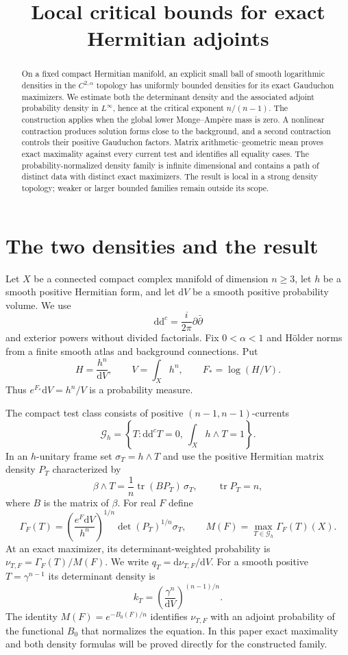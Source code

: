 \documentclass[11pt]{article}
\title{Local critical bounds for exact Hermitian adjoints}
\author{}
\date{}
\newcommand{\ddc}{\mathrm{d}\mathrm{d}^c}
\newcommand{\Ga}{\mathcal G_h}
\begin{document}
\maketitle
\begin{abstract}
On a fixed compact Hermitian manifold, an explicit small ball of smooth
logarithmic densities in the $C^{2,\alpha}$ topology has uniformly bounded
densities for its exact Gauduchon maximizers. We estimate both the determinant
density and the associated adjoint probability density in $L^\infty$, hence
at the critical exponent $n/(n-1)$. The construction applies when the global
lower Monge--Amp\`ere mass is zero. A nonlinear contraction produces solution
forms close to the background, and a second contraction controls their
positive Gauduchon factors. Matrix arithmetic--geometric mean proves exact
maximality against every current test and identifies all equality cases.
The probability-normalized density family is infinite dimensional and
contains a path of distinct data with distinct exact maximizers. The result
is local in a strong density topology; weaker or larger bounded families
remain outside its scope.
\end{abstract}

\section{The two densities and the result}

Let $X$ be a connected compact complex manifold of dimension $n\ge3$,
let $h$ be a smooth positive Hermitian form, and let $\mathrm dV$ be a
smooth positive probability volume. We use
\[
 \ddc=\frac{i}{2\pi}\partial\bar\partial
\]
and exterior powers without divided factorials. Fix $0<\alpha<1$ and
H\"older norms from a finite smooth atlas and background connections.
Put
\[
 H=\frac{h^n}{\mathrm dV},\qquad V=\int_Xh^n,
 \qquad F_* =\log(H/V).
\]
Thus $e^{F_*}\mathrm dV=h^n/V$ is a probability measure.

The compact test class consists of positive $(n-1,n-1)$-currents
\[
 \Ga=\left\{T:\ddc T=0,\ \int_Xh\wedge T=1\right\}.
\]
In an $h$-unitary frame set $\sigma_T=h\wedge T$ and use the positive
Hermitian matrix density $P_T$ characterized by
\[
 \beta\wedge T=\frac1n\operatorname{tr}(BP_T)\,\sigma_T,
 \qquad \operatorname{tr}P_T=n,
\]
where $B$ is the matrix of $\beta$. For real $F$ define
\[
 \Gamma_F(T)=\left(\frac{e^F\mathrm dV}{h^n}\right)^{1/n}
                  \det(P_T)^{1/n}\sigma_T,
 \qquad M(F)=\max_{T\in\Ga}\Gamma_F(T)(X).
\]
At an exact maximizer, its determinant-weighted probability is
$\nu_{T,F}=\Gamma_F(T)/M(F)$. We write $q_T=\mathrm d\nu_{T,F}/\mathrm dV$.
For a smooth positive $T=\gamma^{n-1}$ its determinant density is
\[
 k_T=\left(\frac{\gamma^n}{\mathrm dV}\right)^{(n-1)/n}.
\]
The identity $M(F)=e^{-B_0(F)/n}$ identifies $\nu_{T,F}$ with an adjoint
probability of the functional $B_0$ that normalizes the equation. In this paper
exact maximality and both density formulas will be proved directly for
the constructed family.
\end{document}
